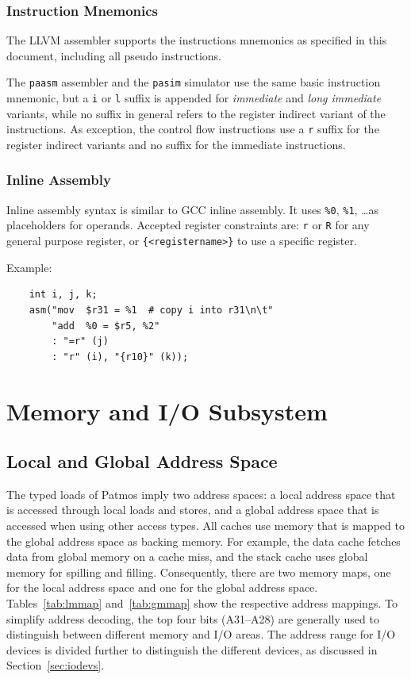 \documentclass[a4paper,fontsize=10pt,twoside,DIV15,BCOR12mm,headinclude=true,footinclude=false,pagesize,bibtotoc]{scrbook}
\newcommand{\comment}[3]{

\textsf{\textbf{#1}} {\color{#3}#2}}
\newcommand{\stefan}[1]{\comment{Stefan}{#1}{RoyalPurple}}
\renewcommand{\stefan}[1]{}
\begin{document}
\subsection{Instruction Mnemonics}

The LLVM assembler supports the instructions mnemonics as specified in this document, including all pseudo instructions.

The \texttt{paasm} assembler and the \texttt{pasim} simulator use the same basic instruction mnemonic, but a \texttt{i} or
\texttt{l} suffix is appended for \emph{immediate} and \emph{long immediate} variants, while no suffix in general refers to
the register indirect variant of the instructions. As exception, the control flow instructions use a \texttt{r} suffix for the register
indirect variants and no suffix for the immediate instructions.
\stefan{This should be cleaned up, always use \texttt{i} suffix for immediates in pasim/paasm, including control flow.}

\subsection{Inline Assembly}

Inline assembly syntax is similar to GCC inline assembly. It uses \texttt{\%0}, \texttt{\%1}, \ldots as placeholders
for operands. Accepted register constraints are: \texttt{r} or \texttt{R} for any general purpose register, or
\texttt{\{<registername>\}} to use a specific register.

Example:
\begin{lstlisting}
    int i, j, k;
    asm("mov  $r31 = %1  # copy i into r31\n\t"
        "add  %0 = $r5, %2"
        : "=r" (j)
        : "r" (i), "{r10}" (k));
\end{lstlisting}

\chapter{Memory and I/O Subsystem}
\label{chap:memsyst}

\section{Local and Global Address Space}

The typed loads of Patmos imply two address spaces: a local address
space that is accessed through local loads and stores, and a global
address space that is accessed when using other access types. All
caches use memory that is mapped to the global address space as
backing memory. For example, the data cache fetches data from global
memory on a cache miss, and the stack cache uses global memory for
spilling and filling. Consequently, there are two memory maps, one for
the local address space and one for the global address
space. Tables~\ref{tab:lmmap} and~\ref{tab:gmmap} show the respective
address mappings. To simplify address decoding, the top four bits
(A31--A28) are generally used to distinguish between different memory
and I/O areas. The address range for I/O devices is divided further to
distinguish the different devices, as discussed in
Section~\ref{sec:iodevs}.
\end{document}

